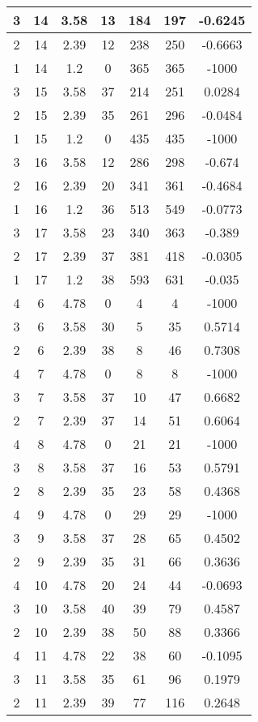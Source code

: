 \documentclass[letterpaper, 12pt]{article}
\begin{document}
\begin{longtable}{|c|c|c|c|c|c|c|}
\hline
3 & 14 & 3.58 & 13 & 184 & 197 & -0.6245 \\
\hline
2 & 14 & 2.39 & 12 & 238 & 250 & -0.6663 \\
\hline
1 & 14 & 1.2 & 0 & 365 & 365 & -1000 \\
\hline
3 & 15 & 3.58 & 37 & 214 & 251 & 0.0284 \\
\hline
2 & 15 & 2.39 & 35 & 261 & 296 & -0.0484 \\
\hline
1 & 15 & 1.2 & 0 & 435 & 435 & -1000 \\
\hline
3 & 16 & 3.58 & 12 & 286 & 298 & -0.674 \\
\hline
2 & 16 & 2.39 & 20 & 341 & 361 & -0.4684 \\
\hline
1 & 16 & 1.2 & 36 & 513 & 549 & -0.0773 \\
\hline
3 & 17 & 3.58 & 23 & 340 & 363 & -0.389 \\
\hline
2 & 17 & 2.39 & 37 & 381 & 418 & -0.0305 \\
\hline
1 & 17 & 1.2 & 38 & 593 & 631 & -0.035 \\
\hline
4 & 6 & 4.78 & 0 & 4 & 4 & -1000 \\
\hline
3 & 6 & 3.58 & 30 & 5 & 35 & 0.5714 \\
\hline
2 & 6 & 2.39 & 38 & 8 & 46 & 0.7308 \\
\hline
4 & 7 & 4.78 & 0 & 8 & 8 & -1000 \\
\hline
3 & 7 & 3.58 & 37 & 10 & 47 & 0.6682 \\
\hline
2 & 7 & 2.39 & 37 & 14 & 51 & 0.6064 \\
\hline
4 & 8 & 4.78 & 0 & 21 & 21 & -1000 \\
\hline
3 & 8 & 3.58 & 37 & 16 & 53 & 0.5791 \\
\hline
2 & 8 & 2.39 & 35 & 23 & 58 & 0.4368 \\
\hline
4 & 9 & 4.78 & 0 & 29 & 29 & -1000 \\
\hline
3 & 9 & 3.58 & 37 & 28 & 65 & 0.4502 \\
\hline
2 & 9 & 2.39 & 35 & 31 & 66 & 0.3636 \\
\hline
4 & 10 & 4.78 & 20 & 24 & 44 & -0.0693 \\
\hline
3 & 10 & 3.58 & 40 & 39 & 79 & 0.4587 \\
\hline
2 & 10 & 2.39 & 38 & 50 & 88 & 0.3366 \\
\hline
4 & 11 & 4.78 & 22 & 38 & 60 & -0.1095 \\
\hline
3 & 11 & 3.58 & 35 & 61 & 96 & 0.1979 \\
\hline
2 & 11 & 2.39 & 39 & 77 & 116 & 0.2648 \\

\end{longtable}
\end{document}

